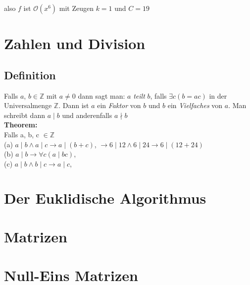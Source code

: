 \documentclass[12pt]{scrartcl}
\begin{document}
also $f$ ist $\mathcal{O}(x^6)$ mit Zeugen $k=1$ und $C = 19$


\newpage
\section{Zahlen und Division}
\subsection{Definition}
Falls $a$, $b \in \mathbb{Z}$ mit $a \neq 0$ dann sagt man: $a$ \textit{teilt} $b$, falls $\exists c (b = ac)$
in der Universalmenge $\mathbb{Z}$. Dann ist $a$ ein \textit{Faktor} von $b$ und $b$ ein \textit{Vielfaches}
von $a$. Man schreibt dann $a \mid b$ und anderenfalls $a \nmid b$\\

\textbf{Theorem:}\\
Falls a, b, c $\in \mathbb{Z}$\\
(a) $a \mid  b  \land a \mid c \rightarrow a \mid (b + c)$, $\rightarrow 6 \mid 12 \land 6 \mid 24 \rightarrow 6 \mid (12+24)$ \\  
(b) $a \mid b  \rightarrow \forall c(a \mid bc) $,\\  
(c) $a \mid b  \land b \mid c \rightarrow a \mid c$,\\  

\newpage
\section{Der Euklidische Algorithmus}



\section{Matrizen}



\section{Null-Eins Matrizen}




\end{document}
